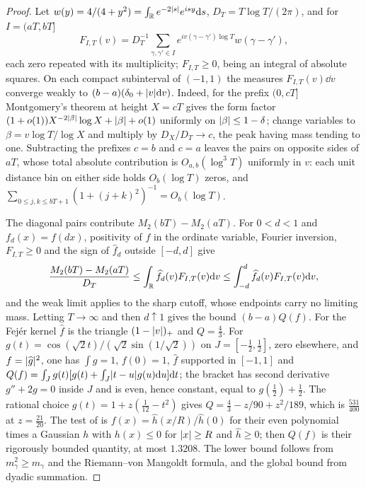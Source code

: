 \begin{proof}
Let $w(y)=4/(4+y^2)=\int_{\mathbb{R}} e^{-2\lvert s\rvert}e^{isy}\mathrm{d} s$, $D_T=T\log T/(2\pi)$, and for $I=(aT,bT]$
\[
 F_{I,T}(v)=D_T^{-1}\sum_{\gamma,\gamma'\in I}e^{iv(\gamma-\gamma')\log T}w(\gamma-\gamma'),
\]
each zero repeated with its multiplicity; $F_{I,T}\ge0$, being an integral of absolute squares. On each
compact subinterval of $(-1,1)$ the measures $F_{I,T}(v)\dd v$ converge weakly to
$(b-a)(\delta_0+\lvert v\rvert\mathrm{d} v)$. Indeed, for the prefix $(0,cT]$ Montgomery's theorem
\cite{Montgomery1973Pair} at height $X=cT$ gives the form factor
$(1+o(1))X^{-2\lvert\beta\rvert}\log X+\lvert\beta\rvert+o(1)$ uniformly on $\lvert\beta\rvert\le1-\delta$; change variables to
$\beta=v\log T/\log X$ and multiply by $D_X/D_T\to c$, the peak having mass tending to one. Subtracting
the prefixes $c=b$ and $c=a$ leaves the pairs on opposite sides of $aT$, whose total absolute
contribution is $O_{a,b}(\log^3T)$ uniformly in $v$: each unit distance bin on either side holds
$O_b(\log T)$ zeros, and $\sum_{0\le j,k\le bT+1}(1+(j+k)^2)^{-1}=O_b(\log T)$.

The diagonal pairs contribute $M_2(bT)-M_2(aT)$. For $0<d<1$ and $f_d(x)=f(dx)$, positivity of $f$ in the
ordinate variable, Fourier inversion, $F_{I,T}\ge0$ and the sign of $\widehat f_d$ outside $[-d,d]$ give
\[
 \frac{M_2(bT)-M_2(aT)}{D_T}\le\int_{\mathbb{R}}\widehat f_d(v)F_{I,T}(v)\mathrm{d} v\le\int_{-d}^d\widehat f_d(v)F_{I,T}(v)\mathrm{d} v ,
\]
and the weak limit applies to the sharp cutoff, whose endpoints carry no limiting mass. Letting
$T\to\infty$ and then $d\uparrow1$ gives the bound $(b-a)Q(f)$. For the Fej\'er kernel $\widehat f$ is the
triangle $(1-\lvert v\rvert)_+$ and $Q=\tfrac43$. For $g(t)=\cos(\sqrt2t)/(\sqrt2\sin(1/\sqrt2))$ on
$J=[-\tfrac12,\tfrac12]$, zero elsewhere, and $f=\lvert\widehat g\rvert^2$, one has $\int g=1$, $f(0)=1$, $\widehat f$
supported in $[-1,1]$ and $Q(f)=\int_Jg(t)[g(t)+\int_J\lvert t-u\rvert g(u)\mathrm{d} u]\mathrm{d} t$; the bracket has second
derivative $g''+2g=0$ inside $J$ and is even, hence constant, equal to $g(\tfrac12)+\tfrac12$. The
rational choice $g(t)=1+z(\tfrac1{12}-t^2)$ gives $Q=\tfrac43-z/90+z^2/189$, which is $\tfrac{531}{400}$ at
$z=\tfrac{21}{20}$. The test of \cite[proof of Theorem~1]{ChirreGoncalvesdeLaat2020Pair} is
$f(x)=\widehat h(x/R)/\widehat h(0)$ for their even polynomial times a Gaussian $h$ with $h(x)\le0$ for
$\lvert x\rvert\ge R$ and $\widehat h\ge0$; then $Q(f)$ is their rigorously bounded quantity, at most $1.3208$.
The lower bound follows from $m_\gamma^2\ge m_\gamma$ and the Riemann--von Mangoldt formula, and the global
bound from dyadic summation.
\end{proof}

